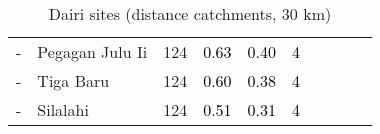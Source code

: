 \begin{table}[ht]
\begin{tabular}{C{0.03\textwidth}C{0.12\textwidth}C{0.09\textwidth}C{0.08\textwidth}C{0.08\textwidth}C{0.08\textwidth}C{0.07\textwidth}C{0.07\textwidth}C{0.07\textwidth}C{0.07\textwidth}}
  {-} & Pegagan Julu Ii & 124 & \textcolor[HTML]{000000}{0.63} & \textcolor[HTML]{000000}{0.40} & \textcolor[HTML]{000000}{4} &  &  &  &  \\ 
  {-} & Tiga Baru & 124 & \textcolor[HTML]{000000}{0.60} & \textcolor[HTML]{000000}{0.38} & \textcolor[HTML]{000000}{4} &  &  &  &  \\ 
  {-} & Silalahi & 124 & \textcolor[HTML]{000000}{0.51} & \textcolor[HTML]{000000}{0.31} & \textcolor[HTML]{000000}{4} &  &  &  &  \\ 
  \end{tabular}
\endgroup
\caption{Dairi sites (distance catchments, 30 km)} 
\label{tab:dairi_dist}
\end{table}
